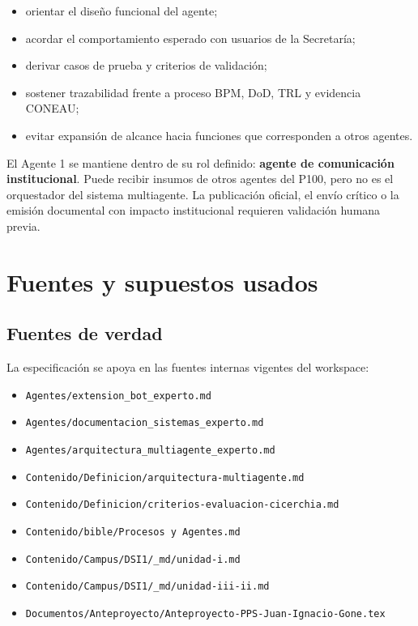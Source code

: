 \documentclass[11pt,a4paper]{article}
\begin{document}
\begin{itemize}
  \item orientar el diseño funcional del agente;
  \item acordar el comportamiento esperado con usuarios de la Secretaría;
  \item derivar casos de prueba y criterios de validación;
  \item sostener trazabilidad frente a proceso BPM, DoD, TRL y evidencia CONEAU;
  \item evitar expansión de alcance hacia funciones que corresponden a otros agentes.
\end{itemize}

El Agente 1 se mantiene dentro de su rol definido: \textbf{agente de comunicación institucional}. Puede recibir insumos de otros agentes del P100, pero no es el orquestador del sistema multiagente. La publicación oficial, el envío crítico o la emisión documental con impacto institucional requieren validación humana previa.

\section{Fuentes y supuestos usados}

\subsection{Fuentes de verdad}

La especificación se apoya en las fuentes internas vigentes del workspace:

\begin{itemize}
  \item \texttt{Agentes/extension\_bot\_experto.md}
  \item \texttt{Agentes/documentacion\_sistemas\_experto.md}
  \item \texttt{Agentes/arquitectura\_multiagente\_experto.md}
  \item \texttt{Contenido/Definicion/arquitectura-multiagente.md}
  \item \texttt{Contenido/Definicion/criterios-evaluacion-cicerchia.md}
  \item \texttt{Contenido/bible/Procesos y Agentes.md}
  \item \texttt{Contenido/Campus/DSI1/\_md/unidad-i.md}
  \item \texttt{Contenido/Campus/DSI1/\_md/unidad-iii-ii.md}
  \item \texttt{Documentos/Anteproyecto/Anteproyecto-PPS-Juan-Ignacio-Gone.tex}
\end{itemize}
\end{document}
